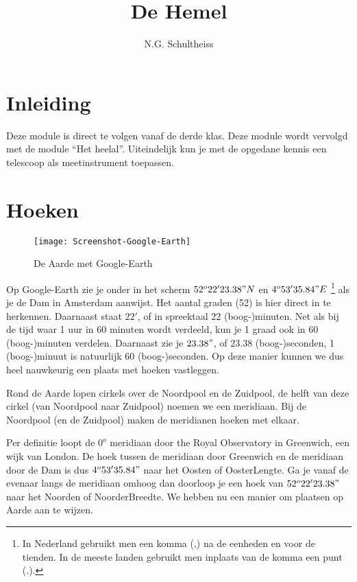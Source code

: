 



\title{De Hemel}
\author{N.G. Schultheiss}
\date{}

\maketitle
\thispagestyle{firststyle}

\section{Inleiding}

Deze module is direct te volgen vanaf de derde klas. Deze module wordt
vervolgd met de module ``Het heelal''. Uiteindelijk kun je met de
opgedane kennis een telescoop als meetinstrument toepassen. 


\section{Hoeken}

\begin{figure}[H]
\noindent \begin{centering}
\texttt{[image: Screenshot-Google-Earth]}
\par\end{centering}

\caption{De Aarde met Google-Earth}
\end{figure}


Op Google-Earth zie je onder in het scherm $52^{o}22'23.38"N$ en
$4^{o}53'35.84"E$ \footnote{In Nederland gebruikt men een komma (,) na
de eenheden en voor de tienden. In de meeste landen gebruikt men
inplaats van de komma een punt (.).} als je de Dam in Amsterdam
aanwijst. Het aantal graden (52) is hier direct in te herkennen.
Daarnaast staat $22'$, of in spreektaal 22 (boog-)minuten. Net als bij
de tijd waar 1 uur in 60 minuten wordt verdeeld, kun je 1 graad ook in
60 (boog-)minuten verdelen. Daarnaast zie je $23.38"$, of 23.38
(boog-)seconden, 1 (boog-)minuut is natuurlijk 60 (boog-)seconden. Op
deze manier kunnen we dus heel nauwkeurig een plaats met hoeken
vastleggen. 

Rond de Aarde lopen cirkels over de Noordpool en de Zuidpool, de helft
van deze cirkel (van Noordpool naar Zuidpool) noemen we een meridiaan.
Bij de Noordpool (en de Zuidpool) maken de meridianen hoeken met elkaar. 

Per definitie loopt de $0^{o}$ meridiaan door the Royal Observatory
in Greenwich, een wijk van London. De hoek tussen de meridiaan door
Greenwich en de meridiaan door de Dam is dus $4^{o}53'35.84"$ naar
het Oosten of OosterLengte. Ga je vanaf de evenaar langs de meridiaan
omhoog dan doorloop je een hoek van $52^{o}22'23.38"$ naar het Noorden
of NoorderBreedte. We hebben nu een manier om plaatsen op Aarde aan
te wijzen.

